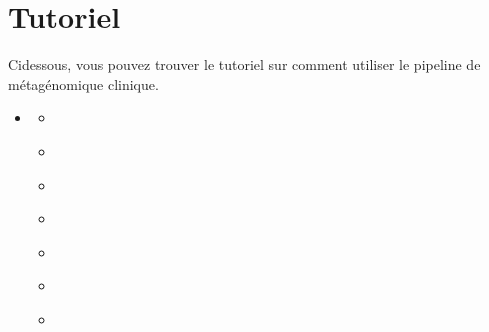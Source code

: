 \documentclass[letterpaper,10pt,french]{sphinxmanual}
\begin{document}
\section{Tutoriel}
\label{\detokenize{tutorial:tutoriel}}\label{\detokenize{tutorial::doc}}
Ci\sphinxhyphen{}dessous, vous pouvez trouver le tutoriel sur comment utiliser le pipeline de métagénomique clinique.

\begin{sphinxShadowBox}
\begin{itemize}
\item {} 
\label{\detokenize{tutorial:id37}}{\hyperref[\detokenize{tutorial:tutoriel}]{}}
\begin{itemize}
\item {} 
\label{\detokenize{tutorial:id38}}{\hyperref[\detokenize{tutorial:le-pretraitement-des-reads}]{}}

\item {} 
\label{\detokenize{tutorial:id39}}{\hyperref[\detokenize{tutorial:le-telechargement-de-la-base-de-donnees-fda-argos}]{}}

\item {} 
\label{\detokenize{tutorial:id40}}{\hyperref[\detokenize{tutorial:le-telechargement-de-la-base-de-donnees-mycocosm}]{}}

\item {} 
\label{\detokenize{tutorial:id41}}{\hyperref[\detokenize{tutorial:le-telechargement-de-la-base-de-donnees-fungidb}]{}}

\item {} 
\label{\detokenize{tutorial:id42}}{\hyperref[\detokenize{tutorial:le-telechargement-de-la-base-de-donnees-refseq}]{}}

\item {} 
\label{\detokenize{tutorial:id43}}{\hyperref[\detokenize{tutorial:l-indexation-d-une-base-de-donnees-avec-kraken-2}]{}}

\item {} 
\label{\detokenize{tutorial:id44}}{\hyperref[\detokenize{tutorial:classification-des-reads-avec-kraken-2}]{}}


\end{itemize}
\end{itemize}
\end{sphinxShadowBox}
\end{document}
